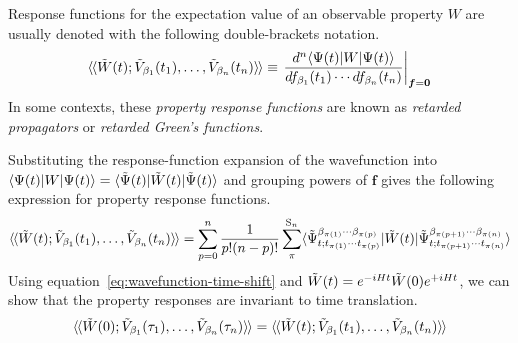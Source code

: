 \documentclass[11pt]{article}
\numberwithin{equation}{section}
\begin{document}
\begin{dfn}
Response functions for the expectation value of an observable property $W$ are usually denoted with the following double-brackets notation.
\begin{align}
  \iip{\tl{W}(t); \tl{V}_{\b_1}(t_1),\ld,\tl{V}_{\b_n}(t_n)}
\equiv
  \left.
  \fd{^n
    \ip{\Y(t)|W|\Y(t)}
  }{
    f_{\b_1}(t_1)
    \cd
    df_{\b_n}(t_n)
  }
  \right|_{\bm{f}=\bo{0}}
\end{align}%
In some contexts, these \textit{property response functions} are known as \textit{retarded propagators} or \textit{retarded Green's functions}.

\end{dfn}

\begin{ex}
Substituting the response-function expansion of the wavefunction into $\langle\Psi (t)|W|\Psi (t)\rangle=\langle\tilde{\Psi }(t)|\tilde{W}(t)|\tilde{\Psi }(t)\rangle$ and grouping powers of $\bm{f}$ gives the following expression for property response functions.
\begin{align}
\label{eq:general-linear-response}
  \iip{\tl{W}(t); \tl{V}_{\b_1}(t_1),\ld,\tl{V}_{\b_n}(t_n)}
=
  \sum_{p=0}^n
  \fr{1}{p!(n-p)!}
  \sum_\pi^{\mr{S}_n}
  \ip{
    \tl{\Y}_{t;t_{\pi(1)}\cd t_{\pi(p)}}
           ^{\b_{\pi(1)}\cd\b_{\pi(p)}}
  |
    \tl{W}(t)
  |
    \tl{\Y}_{t;t_{\pi(p+1)}\cd t_{\pi(n)}}
           ^{\b_{\pi(p+1)}\cd \b_{\pi(n)}}
  }
\end{align}
Using equation~\ref{eq:wavefunction-time-shift} and $\tilde{W}(t)=e^{-iHt}\tilde{W}(0)e^{+iHt}$, we can show that the property responses are invariant to time translation.
\begin{align}
  {\ensuremath{{\langle}\hspace{-1pt}{\langle}}} \tilde{W}(0); \tilde{V}_{\beta _1}(\tau _1),\ldots,\tilde{V}_{\beta _n}(\tau _n) {{\rangle}\hspace{-1pt}{\rangle}}
=
  {{\langle}\hspace{-1pt}{\langle}} \tilde{W}(t); \tilde{V}_{\beta _1}(t_1),\ldots,\tilde{V}_{\beta _n}(t_n) {{\rangle}\hspace{-1pt}{\rangle}}
\end{align}
\end{ex}

\begin{prop}
\label{prop:linear-response-commutator-expression}
\vspace{6pt}
\end{prop}
\end{document}
